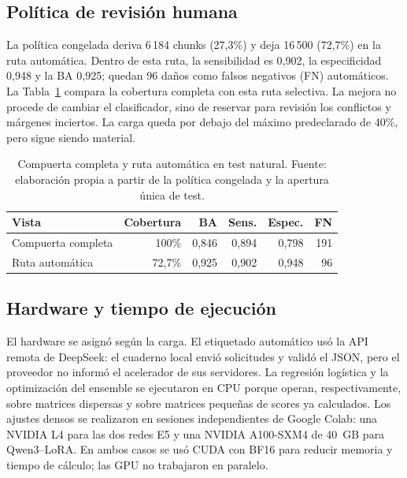 \subsection{Política de revisión humana}

La política congelada deriva 6\,184 chunks (27,3\%) y deja 16\,500 (72,7\%) en la ruta automática. Dentro de esta ruta, la sensibilidad es 0,902, la especificidad 0,948 y la BA 0,925; quedan 96 daños como falsos negativos (FN) automáticos. La Tabla~\ref{tab:revision_test} compara la cobertura completa con esta ruta selectiva. La mejora no procede de cambiar el clasificador, sino de reservar para revisión los conflictos y márgenes inciertos. La carga queda por debajo del máximo predeclarado de 40\%, pero sigue siendo material.

\begin{table}[t]
\centering
\caption{Compuerta completa y ruta automática en test natural. Fuente: elaboración propia a partir de la política congelada y la apertura única de test.}
\label{tab:revision_test}
\footnotesize
\begin{tabular}{@{}lrrrrr@{}}
\toprule
\textbf{Vista} & \textbf{Cobertura} & \textbf{BA} & \textbf{Sens.} & \textbf{Espec.} & \textbf{FN} \\
\midrule
Compuerta completa & 100\% & 0,846 & 0,894 & 0,798 & 191 \\
Ruta automática & 72,7\% & 0,925 & 0,902 & 0,948 & 96 \\
\bottomrule
\end{tabular}
\end{table}

\subsection{Hardware y tiempo de ejecución}

El hardware se asignó según la carga. El etiquetado automático usó la API remota de DeepSeek: el cuaderno local envió solicitudes y validó el JSON, pero el proveedor no informó el acelerador de sus servidores. La regresión logística y la optimización del ensemble se ejecutaron en CPU porque operan, respectivamente, sobre matrices dispersas y sobre matrices pequeñas de scores ya calculados. Los ajustes densos se realizaron en sesiones independientes de Google Colab: una NVIDIA L4 para las dos redes E5 y una NVIDIA A100-SXM4 de 40~GB para Qwen3--LoRA. En ambos casos se usó CUDA con BF16 para reducir memoria y tiempo de cálculo; las GPU no trabajaron en paralelo.

